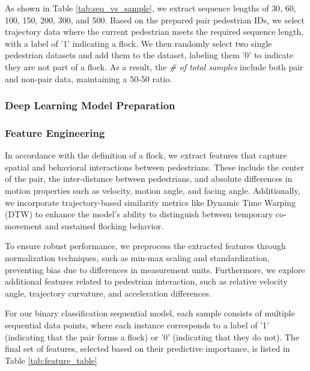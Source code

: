 \documentclass{article}
\begin{document}
As shown in Table \ref{tab:seq_vs_sample}, we extract sequence lengths of 30, 60, 100, 150, 200, 300, and 500. Based on the prepared pair pedestrian IDs, we select trajectory data where the current pedestrian meets the required sequence length, with a label of '1' indicating a flock. We then randomly select two single pedestrian datasets and add them to the dataset, labeling them '0' to indicate they are not part of a flock. As a result, the \textit{\# of total samples} include both pair and non-pair data, maintaining a 50-50 ratio. 


\subsubsection{Deep Learning Model Preparation}

\subsubsection*{Feature Engineering}

In accordance with the definition of a flock, we extract features that capture spatial and behavioral interactions between pedestrians. These include the center of the pair, the inter-distance between pedestrians, and absolute differences in motion properties such as velocity, motion angle, and facing angle. Additionally, we incorporate trajectory-based similarity metrics like Dynamic Time Warping (DTW) to enhance the model's ability to distinguish between temporary co-movement and sustained flocking behavior.

To ensure robust performance, we preprocess the extracted features through normalization techniques, such as min-max scaling and standardization, preventing bias due to differences in measurement units. Furthermore, we explore additional features related to pedestrian interaction, such as relative velocity angle, trajectory curvature, and acceleration differences.

For our binary classification sequential model, each sample consists of multiple sequential data points, where each instance corresponds to a label of '1' (indicating that the pair forms a flock) or '0' (indicating that they do not). The final set of features, selected based on their predictive importance, is listed in Table \ref{tab:feature_table}
\end{document}
